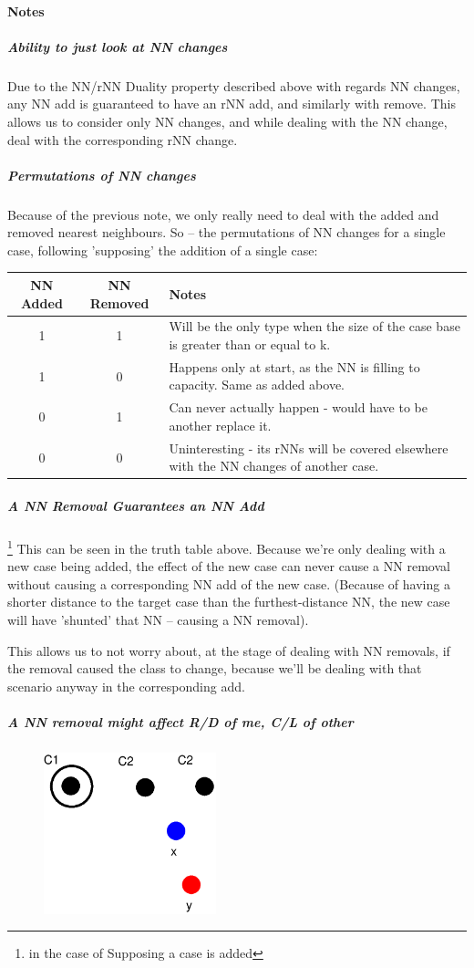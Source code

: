 \documentclass[a4paper,11pt]{report}
\begin{document}
\paragraph{Notes}
\subparagraph{Ability to just look at NN changes}
Due to the NN/rNN Duality property described above with regards NN changes, any NN add is guaranteed to have an rNN add, and similarly with remove. This allows us to consider only NN changes, and while dealing with the NN change, deal with the corresponding rNN change.

\subparagraph{Permutations of NN changes}
Because of the previous note, we only really need to deal with the added and removed nearest neighbours. So – the permutations of NN changes for a single case, following 'supposing' the addition of a single case:

\begin{tabular}{ | c | c | p{5cm} |}
	NN Added & NN Removed & Notes \\ \hline
	1 & 1 & Will be the only type when the size of the case base is greater than or equal to  k. \\ \hline
	1 & 0 & Happens only at start, as the NN is filling to capacity. Same as added above. \\ \hline
	0 & 1 & Can never actually happen - would have to be another replace it. \\ \hline
	0 & 0 & Uninteresting - its rNNs will be covered elsewhere with the NN changes of another case. \\ \hline
\end{tabular}

\subparagraph{A NN Removal Guarantees an NN Add} \footnote{in the case of Supposing a case is added}
This can be seen in the truth table above. Because we're only dealing with a new case being added, the effect of the new case can never cause a NN removal without causing a corresponding NN add of the new case. (Because of having a shorter distance to the target case than the furthest-distance NN, the new case will have 'shunted' that NN – causing a NN removal).

This allows us to not worry about, at the stage of dealing with NN removals, if the removal caused the class to change, because we'll be dealing with that scenario anyway in the corresponding add.

\subparagraph{A NN removal might affect R/D of me, C/L of other}

\begin{figure}[h!]
\includegraphics[width=5cm]{./Drawn/NnMightAffectEg}
\end{figure}
\end{document}
